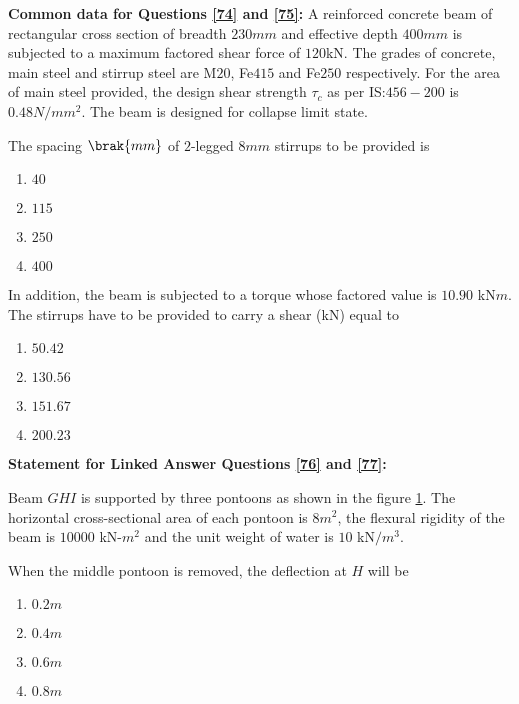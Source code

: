             \item[] \textbf{Common data for Questions \ref{74} and \ref{75}:}
            A reinforced concrete beam of rectangular cross section of breadth $230 mm$ and effective depth $400 mm$ is subjected to a maximum factored shear force of $120 $kN. The grades of concrete, main steel and stirrup steel are M$20$, Fe$415$ and Fe$250$ respectively. For the area of main steel provided, the design shear strength $\tau_c$ as per IS:$456-200$ is $0.48 N/mm^2$. The beam is designed for collapse limit state.
            \item \label{74} The spacing $\brak{mm}$ of $2$-legged $8 mm$ stirrups to be provided is
                \begin{enumerate}
                    \item $40$
                    \item $115$
                    \item $250$
                    \item $400$
                \end{enumerate}
            \item \label{75} In addition, the beam is subjected to a torque whose factored value is $10.90$ kN$m$. The stirrups have to be provided to carry a shear (kN) equal to
                \begin{enumerate}
                    \item $50.42$
                    \item $130.56$
                    \item $151.67$
                    \item $200.23$
                \end{enumerate}

        \item[] \textbf{Statement for Linked Answer Questions \ref{76} and \ref{77}:}

        Beam $GHI$ is supported by three pontoons as shown in the figure \ref{76-77}. The horizontal cross-sectional area of each pontoon is $8m^2$, the flexural rigidity of the beam is $10000$ kN-$m^2$ and the unit weight of water is $10$ kN$/m^3$.
        \begin{figure}[H]
            \centering
            
            \caption{}
            \label{76-77}
        \end{figure}
        \item \label{76} When the middle pontoon is removed, the deflection at $H$ will be
                \begin{enumerate}
                    \item $0.2m$
                    \item $0.4m$
                    \item $0.6m$
                    \item $0.8m$
                \end{enumerate}


